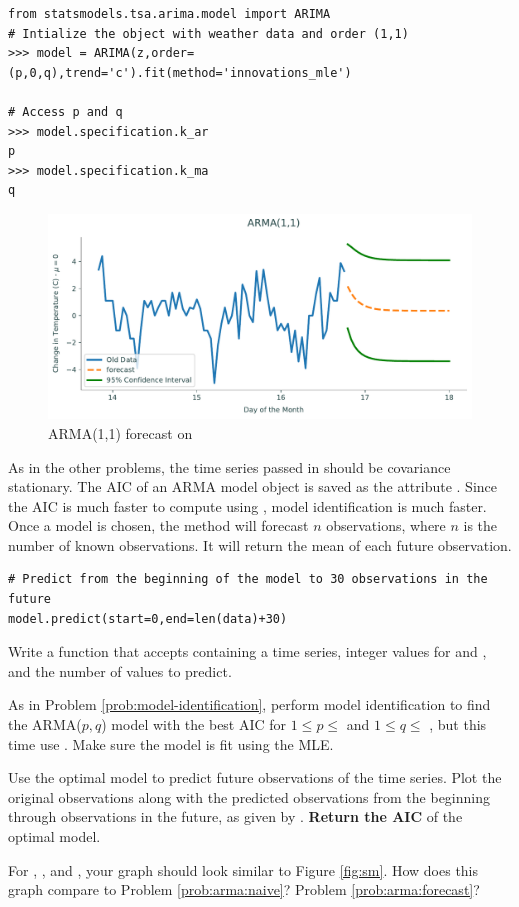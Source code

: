 \begin{lstlisting}
from statsmodels.tsa.arima.model import ARIMA
# Intialize the object with weather data and order (1,1)
>>> model = ARIMA(z,order=(p,0,q),trend='c').fit(method='innovations_mle')

# Access p and q
>>> model.specification.k_ar
p
>>> model.specification.k_ma
q
\end{lstlisting}

\begin{figure}
\centering
\includegraphics[width=\textwidth]{figures/arma.pdf}
\caption{ARMA(1,1) forecast on }
\label{fig:forecasted}
\end{figure}

As in the other problems, the time series passed in should be covariance stationary.
The AIC of an ARMA model object is saved as the attribute .
Since the AIC is much faster to compute using , model identification is much faster.
Once a model is chosen, the method  will forecast $n$ observations, where $n$ is the number of known observations.
It will return the mean of each future observation.

\begin{lstlisting}
# Predict from the beginning of the model to 30 observations in the future
model.predict(start=0,end=len(data)+30)
\end{lstlisting}

\begin{problem}
Write a function  that accepts  containing a time series, integer values for  and , and the number  of values to predict.

As in Problem \ref{prob:model-identification}, perform model identification to find the ARMA($p,q$) model with the best AIC for $1\leq p \leq$  and $1 \leq q \leq$ , but this time use .
Make sure the model is fit using the MLE.

Use the optimal model to predict  future observations of the time series.
Plot the original observations along with the predicted observations from the beginning through  observations in the future, as given by .
\textbf{Return the AIC} of the optimal model.

For , , and , your graph should look similar to Figure \ref{fig:sm}.
How does this graph compare to Problem \ref{prob:arma:naive}? Problem \ref{prob:arma:forecast}?
\label{prob:statsmodels}
\end{problem}

